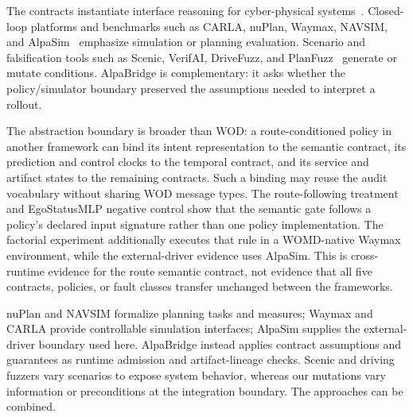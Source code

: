 \documentclass[a4paper,10pt,conference]{ieeeconf}
\begin{document}
The contracts instantiate interface reasoning for cyber-physical
systems~\cite{sangiovanni2012taming,dealfaro2001interface}. Closed-loop platforms and
benchmarks such as CARLA, nuPlan, Waymax, NAVSIM, and
AlpaSim~\cite{dosovitskiy2017carla,karnchanachari2024nuplan,gulino2023waymax,
dauner2024navsim,alpasim2025} emphasize simulation or planning evaluation. Scenario and
falsification tools such as Scenic, VerifAI, DriveFuzz, and
PlanFuzz~\cite{fremont2019scenic,dreossi2019verifai,kim2022drivefuzz,wan2022planfuzz}
generate or mutate conditions. AlpaBridge is complementary: it asks whether the
policy/simulator boundary preserved the assumptions needed to interpret a rollout.

The abstraction boundary is broader than WOD: a route-conditioned policy in another
framework can bind its intent representation to the semantic contract, its prediction
and control clocks to the temporal contract, and its service and artifact states to the
remaining contracts. Such a binding may reuse the audit vocabulary without sharing WOD
message types. The route-following treatment and EgoStatusMLP negative control show that
the semantic gate follows a policy's declared input signature rather than one policy
implementation. The factorial experiment additionally executes that rule in a
WOMD-native Waymax environment, while the external-driver evidence uses AlpaSim. This
is cross-runtime evidence for the route semantic contract, not evidence that all five
contracts, policies, or fault classes transfer unchanged between the frameworks.

nuPlan and NAVSIM formalize planning tasks and measures; Waymax and CARLA provide
controllable simulation interfaces; AlpaSim supplies the external-driver boundary used
here. AlpaBridge instead applies contract assumptions and guarantees as runtime admission
and artifact-lineage checks. Scenic and driving fuzzers vary scenarios to expose system
behavior, whereas our mutations vary information or preconditions at the integration
boundary. The approaches can be combined.
\end{document}
